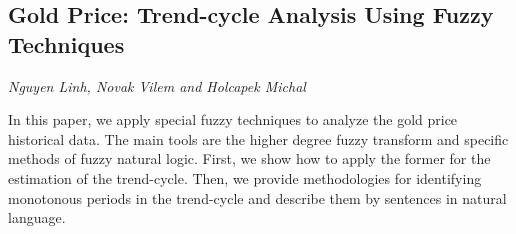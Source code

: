 \documentclass[../booklet.tex]{subfiles}
\begin{document}
\subsection[Gold Price: Trend-cycle Analysis Using Fuzzy Techniques. {\it Nguyen Linh, Novak Vilem and Holcapek Michal}]{Gold Price: Trend-cycle Analysis Using Fuzzy Techniques}
  

\begin{center}
  {\it Nguyen Linh, Novak Vilem and Holcapek Michal}
\end{center}

\vskip 0.8cm


		In this paper, we apply special fuzzy techniques to analyze the gold price historical data. The main tools are the higher degree fuzzy transform and specific methods of fuzzy natural logic. First, we show how to apply the former for the estimation of the trend-cycle. Then, we provide methodologies for identifying monotonous periods in the trend-cycle and describe them by sentences in natural language. 
	
\end{document}
